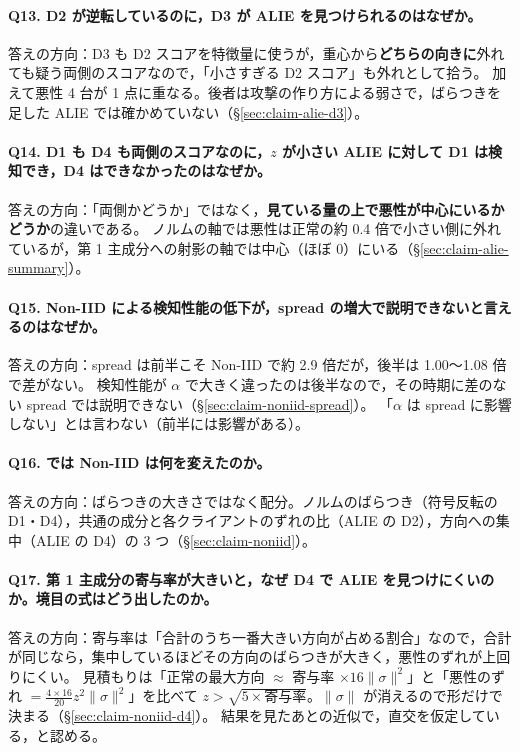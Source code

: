 \documentclass[a4j, dvipdfmx]{jsarticle}  %
\begin{document}
\paragraph{Q13. D2 が逆転しているのに，D3 が ALIE を見つけられるのはなぜか。}
答えの方向：D3 も D2 スコアを特徴量に使うが，重心から\textbf{どちらの向きに}外れても疑う両側のスコアなので，「小さすぎる D2 スコア」も外れとして拾う。
加えて悪性 4 台が 1 点に重なる。後者は攻撃の作り方による弱さで，ばらつきを足した ALIE では確かめていない（\S\ref{sec:claim-alie-d3}）。

\paragraph{Q14. D1 も D4 も両側のスコアなのに，$z$ が小さい ALIE に対して D1 は検知でき，D4 はできなかったのはなぜか。}
答えの方向：「両側かどうか」ではなく，\textbf{見ている量の上で悪性が中心にいるかどうか}の違いである。
ノルムの軸では悪性は正常の約 0.4 倍で小さい側に外れているが，第 1 主成分への射影の軸では中心（ほぼ 0）にいる（\S\ref{sec:claim-alie-summary}）。

\paragraph{Q15. Non-IID による検知性能の低下が，spread の増大で説明できないと言えるのはなぜか。}
答えの方向：spread は前半こそ Non-IID で約 2.9 倍だが，後半は 1.00〜1.08 倍で差がない。
検知性能が $\alpha$ で大きく違ったのは後半なので，その時期に差のない spread では説明できない（\S\ref{sec:claim-noniid-spread}）。
「$\alpha$ は spread に影響しない」とは言わない（前半には影響がある）。

\paragraph{Q16. では Non-IID は何を変えたのか。}
答えの方向：ばらつきの大きさではなく配分。ノルムのばらつき（符号反転の D1・D4），共通の成分と各クライアントのずれの比（ALIE の D2），方向への集中（ALIE の D4）の 3 つ（\S\ref{sec:claim-noniid}）。

\paragraph{Q17. 第 1 主成分の寄与率が大きいと，なぜ D4 で ALIE を見つけにくいのか。境目の式はどう出したのか。}
答えの方向：寄与率は「合計のうち一番大きい方向が占める割合」なので，合計が同じなら，集中しているほどその方向のばらつきが大きく，悪性のずれが上回りにくい。
見積もりは「正常の最大方向 $\approx$ 寄与率 $\times 16\|\sigma\|^2$」と「悪性のずれ $= \frac{4 \times 16}{20} z^2\|\sigma\|^2$」を比べて $z > \sqrt{5 \times \text{寄与率}}$。$\|\sigma\|$ が消えるので形だけで決まる（\S\ref{sec:claim-noniid-d4}）。
結果を見たあとの近似で，直交を仮定している，と認める。
\end{document}
